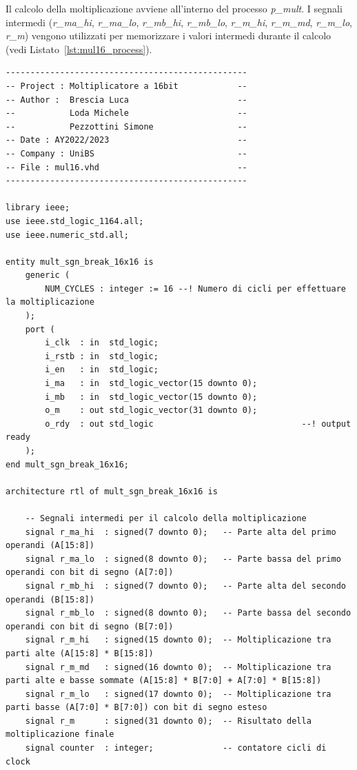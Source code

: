 \documentclass[titlepage]{report}
\begin{document}
		Il calcolo della moltiplicazione avviene all'interno del processo \textit{p\_mult}. I segnali intermedi (\textit{r\_ma\_hi}, \textit{r\_ma\_lo}, \textit{r\_mb\_hi}, \textit{r\_mb\_lo}, \textit{r\_m\_hi}, \textit{r\_m\_md}, \textit{r\_m\_lo}, \textit{r\_m}) vengono utilizzati per memorizzare i valori intermedi durante il calcolo (vedi Listato~\ref{lst:mul16_process}).
		
		\begin{lstlisting}[caption={Processo principale del moltiplicatore}, label={lst:mul16_process}]
-------------------------------------------------
-- Project : Moltiplicatore a 16bit            --
-- Author :  Brescia Luca                      -- 
--           Loda Michele                      --
--           Pezzottini Simone                 --
-- Date : AY2022/2023                          --
-- Company : UniBS                             --
-- File : mul16.vhd                            --
-------------------------------------------------

library ieee;
use ieee.std_logic_1164.all;
use ieee.numeric_std.all;

entity mult_sgn_break_16x16 is
	generic (
		NUM_CYCLES : integer := 16 --! Numero di cicli per effettuare la moltiplicazione
	);
	port ( 
		i_clk  : in  std_logic;
		i_rstb : in  std_logic;
		i_en   : in  std_logic;
		i_ma   : in  std_logic_vector(15 downto 0);
		i_mb   : in  std_logic_vector(15 downto 0);
		o_m    : out std_logic_vector(31 downto 0);
		o_rdy  : out std_logic								--! output ready
	);
end mult_sgn_break_16x16;

architecture rtl of mult_sgn_break_16x16 is

	-- Segnali intermedi per il calcolo della moltiplicazione
	signal r_ma_hi  : signed(7 downto 0);   -- Parte alta del primo operandi (A[15:8])
	signal r_ma_lo  : signed(8 downto 0);   -- Parte bassa del primo operandi con bit di segno (A[7:0])
	signal r_mb_hi  : signed(7 downto 0);   -- Parte alta del secondo operandi (B[15:8])
	signal r_mb_lo  : signed(8 downto 0);   -- Parte bassa del secondo operandi con bit di segno (B[7:0])
	signal r_m_hi   : signed(15 downto 0);  -- Moltiplicazione tra parti alte (A[15:8] * B[15:8])
	signal r_m_md   : signed(16 downto 0);  -- Moltiplicazione tra parti alte e basse sommate (A[15:8] * B[7:0] + A[7:0] * B[15:8])
	signal r_m_lo   : signed(17 downto 0);  -- Moltiplicazione tra parti basse (A[7:0] * B[7:0]) con bit di segno esteso
	signal r_m      : signed(31 downto 0);  -- Risultato della moltiplicazione finale
	signal counter  : integer;              -- contatore cicli di clock


\end{lstlisting}
\end{document}
